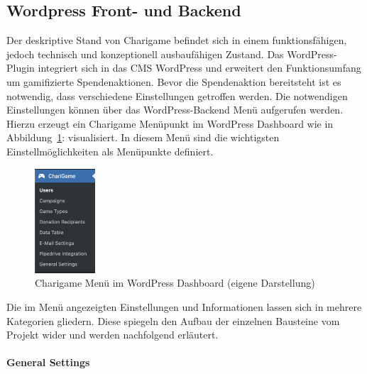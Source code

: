 \subsection{Wordpress Front- und Backend}
\label{subsec:front-backend}
Der deskriptive Stand von Charigame befindet sich in einem funktionsfähigen, jedoch technisch und konzeptionell ausbaufähigen Zustand.
Das WordPress-Plugin integriert sich in das CMS WordPress und erweitert den Funktionsumfang um gamifizierte Spendenaktionen.
Bevor die Spendenaktion bereitsteht ist es notwendig, dass verschiedene Einstellungen getroffen werden.
Die notwendigen Einstellungen können über das WordPress-Backend Menü aufgerufen werden.
\\
Hierzu erzeugt ein Charigame Menüpunkt im WordPress Dashboard wie in Abbildung~\ref{fig:charigame-menu-legacy}: visualisiert.
In diesem Menü sind die wichtigsten Einstellmöglichkeiten als Menüpunkte definiert.
\begin{figure}[tbh]
    \centering
    \includegraphics[width=0.2\textwidth]{images/legacy_charigame_wordpress_menu}
    \caption{Charigame Menü im WordPress Dashboard (eigene Darstellung)}
    \label{fig:charigame-menu-legacy}
\end{figure}

Die im Menü angezeigten Einstellungen und Informationen lassen sich in mehrere Kategorien gliedern.
Diese spiegeln den Aufbau der einzelnen Bausteine vom Projekt wider und werden nachfolgend erläutert.
\\\\
\textbf{General Settings}

